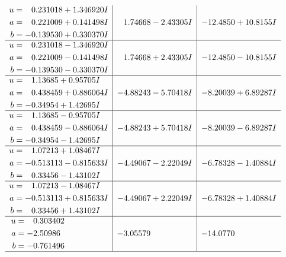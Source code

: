 \documentclass[1p]{elsarticle_modified}
\theoremstyle{definition}
\begin{document}
$$\begin{array}{c|c|c}
\begin{aligned}
u &= \phantom{-}0.231018 + 1.346920 I \\
a &= \phantom{-}0.221009 + 0.141498 I \\
b &= -0.139530 + 0.330370 I\end{aligned}
 & \phantom{-}1.74668 - 2.43305 I & -12.4850 + 10.8155 I \\ \hline\begin{aligned}
u &= \phantom{-}0.231018 - 1.346920 I \\
a &= \phantom{-}0.221009 - 0.141498 I \\
b &= -0.139530 - 0.330370 I\end{aligned}
 & \phantom{-}1.74668 + 2.43305 I & -12.4850 - 10.8155 I \\ \hline\begin{aligned}
u &= \phantom{-}1.13685 + 0.95705 I \\
a &= \phantom{-}0.438459 + 0.886064 I \\
b &= -0.34954 + 1.42695 I\end{aligned}
 & -4.88243 - 5.70418 I & -8.20039 + 6.89287 I \\ \hline\begin{aligned}
u &= \phantom{-}1.13685 - 0.95705 I \\
a &= \phantom{-}0.438459 - 0.886064 I \\
b &= -0.34954 - 1.42695 I\end{aligned}
 & -4.88243 + 5.70418 I & -8.20039 - 6.89287 I \\ \hline\begin{aligned}
u &= \phantom{-}1.07213 + 1.08467 I \\
a &= -0.513113 - 0.815633 I \\
b &= \phantom{-}0.33456 - 1.43102 I\end{aligned}
 & -4.49067 - 2.22049 I & -6.78328 - 1.40884 I \\ \hline\begin{aligned}
u &= \phantom{-}1.07213 - 1.08467 I \\
a &= -0.513113 + 0.815633 I \\
b &= \phantom{-}0.33456 + 1.43102 I\end{aligned}
 & -4.49067 + 2.22049 I & -6.78328 + 1.40884 I \\ \hline\begin{aligned}
u &= \phantom{-}0.303402\phantom{ +0.000000I} \\
a &= -2.50986\phantom{ +0.000000I} \\
b &= -0.761496\phantom{ +0.000000I}\end{aligned}
 & -3.05579\phantom{ +0.000000I} & -14.0770\phantom{ +0.000000I}\\
 \hline 
 \end{array}$$\newpage\newpage\renewcommand{\arraystretch}{1}
\end{document}
